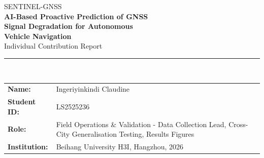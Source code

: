 \documentclass[12pt,a4paper]{article}
\begin{document}

\begin{center}
 
  {\normalsize\color{buaaBlue} SENTINEL-GNSS}\\[0.25cm]
  {\LARGE\bfseries\color{buaaNavy} AI-Based Proactive Prediction of GNSS\\[0.2cm]
   Signal Degradation for Autonomous\\[0.4cm]
   Vehicle Navigation}\\[0.45cm]
  {\large\color{buaaBlue} Individual Contribution Report}\\[0.5cm]
  {\color{buaaNavy}\rule{\linewidth}{2pt}}\\[0.8cm]

 
\begin{tabularx}{\textwidth}{l X}
    \textbf{Name:}       & Ingeriyinkindi Claudine \\
    \textbf{Student ID:} & LS2525236 \\
    \textbf{Role:}       & Field Operations \& Validation - Data Collection Lead, Cross-City Generalisation Testing, Results Figures \\
    \textbf{Institution:}& Beihang University H3I, Hangzhou, 2026 \\
\end{tabularx}
\end{center}
\vspace{0.8cm}

\begin{abstract}
This report documents my contributions to the SENTINEL-GNSS pilot project in full depth.

My primary roles were field operations lead and cross-city generalisation analyst.
For field operations, I designed all five Beihang campus collection scenarios (A--E),
walked and GPS-mapped each site before collection, executed all 34 data collection runs,
maintained a field logbook documenting each blockage event, and coordinated with Joshua
for real-time data quality checks.
This collection produced the 10690 epoch Beihang campus component of the training
dataset.

For cross-city generalisation, I designed and executed the full evaluation methodology:
downloading and processing the UrbanNav Hong Kong, Tokyo, and Oxford RobotCar datasets,
applying the trained SENTINEL model without retraining, and producing the cross-city
comparison that became the central argument of the paper.
The finding that SENTINEL retains DEGRADED-class F1\,=\,0.753 on held-out Tokyo while
RandomForest collapses to 0.148 originated from experiments I ran.

Additionally, I produced all 13 publication-quality results figures and formatted all
results tables for Section~5 of the team paper.
\end{abstract}
\end{document}
